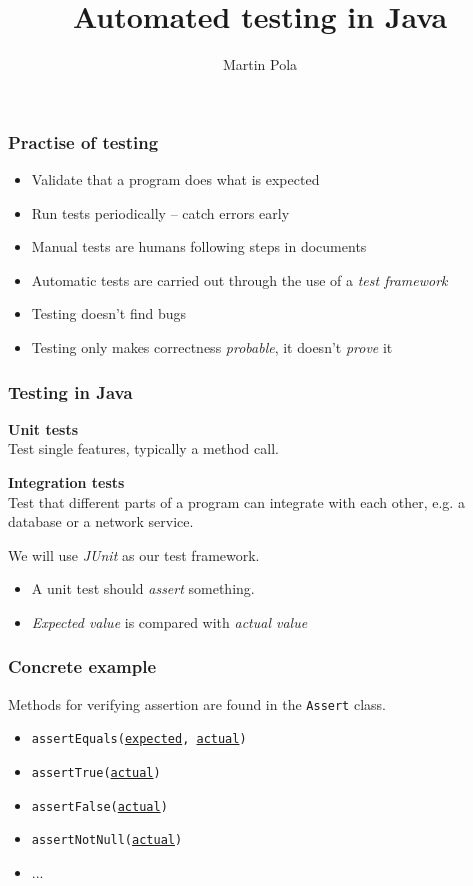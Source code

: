 \documentclass{beamer}
\title{Automated testing in Java}
\author{Martin Pola}
\date{}
\begin{document}
	\maketitle
	
	\frame
	{
		\frametitle{Practise of testing}

		\begin{itemize}
			\item Validate that a program does what is expected
			\item Run tests periodically -- catch errors early
			\item Manual tests are humans following steps in documents
			\item Automatic tests are carried out through the use of a \emph{test framework}
		\end{itemize}

		\pause
		\begin{itemize}
			\item Testing doesn't find bugs
			\item Testing only makes correctness \emph{probable}, it doesn't \emph{prove} it
		\end{itemize}
	}

	\frame
	{
		\frametitle{Testing in Java}

		\textbf{Unit tests} \\
		Test single features, typically a method call.

		\textbf{Integration tests} \\
		Test that different parts of a program can integrate with each other, e.g. a database or a network service.

		\pause
		We will use \emph{JUnit} as our test framework.

		\begin{itemize}
			\item A unit test should \emph{assert} something.
			\item \emph{Expected value} is compared with \emph{actual value}
		\end{itemize}
	}

	\frame
	{
		\frametitle{Concrete example}

		
		
		\pause
		Methods for verifying assertion are found in the \texttt{Assert} class.
		
		\begin{itemize}
			\item \texttt{assertEquals(\underline{expected}, \underline{actual})}
			\item \texttt{assertTrue(\underline{actual})}
			\item \texttt{assertFalse(\underline{actual})}
			\item \texttt{assertNotNull(\underline{actual})}
			\item ...
		\end{itemize}
	}
\end{document}

